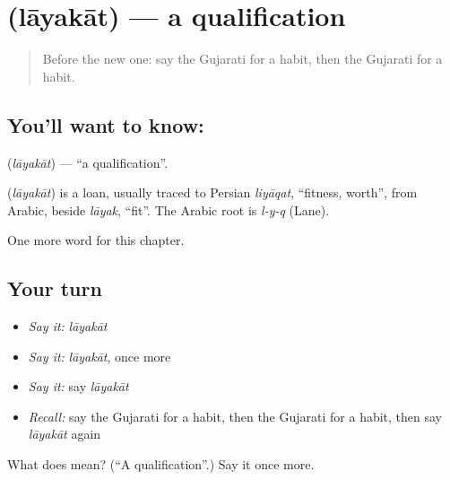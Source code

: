 \section[\texorpdfstring{\gu{લાયકાત} (lāyakāt)}{લાયકાત (lāyakāt)}]{ (lāyakāt) — a qualification}

\label{lesson:GU-C104-layakat}



\begin{quote}
Before the new one: say the Gujarati for a habit, then the Gujarati for a habit.
\end{quote}

\subsection*{You'll want to know: }
\textbf{} (\emph{lāyakāt}) — \textquotedblleft{}a qualification\textquotedblright{}.

\begin{cousinweb}
\textbf{} (\emph{lāyakāt}) is a loan, usually traced to Persian \emph{liyāqat}, \textquotedblleft{}fitness, worth\textquotedblright{}, from Arabic, beside \emph{lāyak}, \textquotedblleft{}fit\textquotedblright{}. The Arabic root is \emph{l-y-q} (Lane).
\end{cousinweb}

\begin{grammarlens}[title={What you've built}]
One more word for this chapter.
\end{grammarlens}

\subsection*{Your turn}
\begin{itemize}
\raggedright
  \item \emph{Say it:} \emph{lāyakāt}
  \item \emph{Say it:} \emph{lāyakāt}, once more
  \item \emph{Say it:} say \emph{lāyakāt}
  \item \emph{Recall:} say the Gujarati for a habit, then the Gujarati for a habit, then say \emph{lāyakāt} again
\end{itemize}

\begin{tcolorbox}[breakable,colback=teal!4,colframe=teal!35!black,title={Before you move on}]
What does  mean? (\textquotedblleft{}A qualification\textquotedblright{}.) Say it once more.
\end{tcolorbox}
